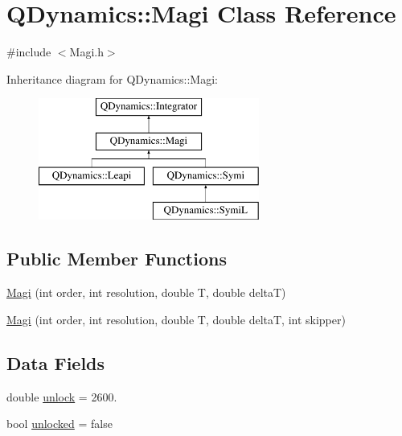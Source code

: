 \hypertarget{classQDynamics_1_1Magi}{}\section{Q\+Dynamics\+:\+:Magi Class Reference}
\label{classQDynamics_1_1Magi}


{\ttfamily \#include $<$Magi.\+h$>$}

Inheritance diagram for Q\+Dynamics\+:\+:Magi\+:\begin{figure}[H]
\begin{center}
\leavevmode
\includegraphics[height=4.000000cm]{classQDynamics_1_1Magi}
\end{center}
\end{figure}
\subsection*{Public Member Functions}
\begin{DoxyCompactItemize}
\item 
\hyperlink{classQDynamics_1_1Magi_a5b95b7c32c314e2800f59366964abfc3}{Magi} (int order, int resolution, double T, double deltaT)
\item 
\hyperlink{classQDynamics_1_1Magi_a89efe9c4722cbeb447662ee727af0570}{Magi} (int order, int resolution, double T, double deltaT, int skipper)
\end{DoxyCompactItemize}
\subsection*{Data Fields}
\begin{DoxyCompactItemize}
\item 
double \hyperlink{classQDynamics_1_1Magi_a11af2e624714857cf13343f1745f2fa8}{unlock} = 2600.
\item 
bool \hyperlink{classQDynamics_1_1Magi_aba1aa111cd53a194854a2a8ac4b06b32}{unlocked} = false
\end{DoxyCompactItemize}
